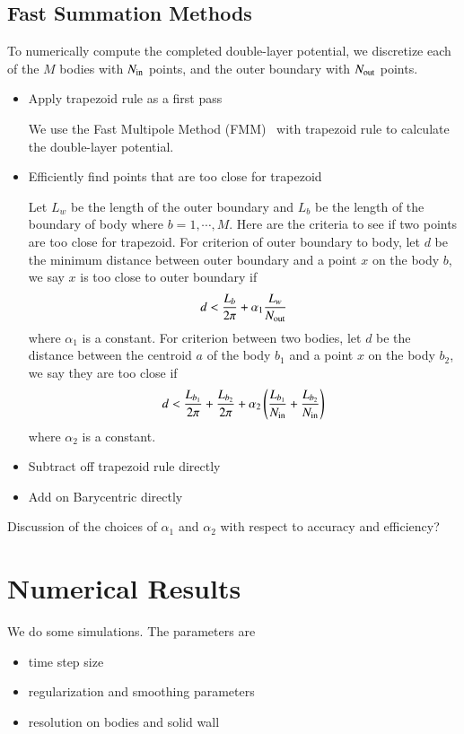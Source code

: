 \documentclass[preprint, 10pt]{elsarticle}
\begin{document}
\subsection{Fast Summation Methods}
\label{sec:fmm}
{\color{red}
To numerically compute the completed double-layer potential, we discretize each of the $M$ bodies with  $N_{\mathrm{in}}$ points, and the outer boundary with $N_{\mathrm{out}}$ points.
}
\begin{itemize}
  \item Apply trapezoid rule as a first pass

{\color{red} We use the Fast Multipole Method (FMM)~\cite{gre-rok1987, gre-gre-may1992} with trapezoid rule to calculate the double-layer potential.
}
  \item Efficiently find points that are too close for trapezoid

{\color{red}
 Let $L_w$ be the length of the outer boundary and $L_{b}$ be the length of the boundary of body where $b=1, \cdots, M$. Here are the criteria to see if two points are too close for trapezoid. For criterion of outer boundary to body,  let $d$ be the minimum distance between outer boundary and a point $x$ on the body $b$, we say $x$ is too close to outer boundary if
$$d<\frac{L_{b}}{2\pi} + \alpha_1\frac{L_w}{N_{\mathrm{out}}}$$
where $\alpha_1$ is a constant. 
For criterion between two bodies, let $d$ be the distance between the centroid $a$ of the body $b_1$ and a point $x$ on the body $b_2$, we say they are too close if
$$d<\frac{L_{b_1}}{2\pi}+\frac{L_{b_2}}{2\pi}+\alpha_2\left(\frac{L_{b_1}}{N_{\mathrm{in}}}+\frac{L_{b_2}}{N_{\mathrm{in}}}\right)$$
where $\alpha_2$ is a constant. 

}
  \item Subtract off trapezoid rule directly
  \item Add on Barycentric directly
\end{itemize}
{\color{red} Discussion of the choices of $\alpha_1$ and $\alpha_2$ with respect to accuracy and  efficiency?}

\section{Numerical Results}
\label{s:results}
We do some simulations.  The parameters are
\begin{itemize}
  \item time step size
  \item regularization and smoothing parameters
  \item resolution on bodies and solid wall
\end{itemize}
\end{document}
